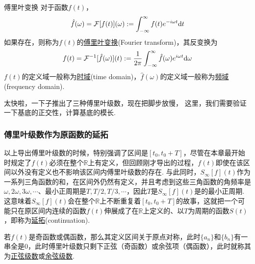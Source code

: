 \begin{definition}{傅里叶变换}
    对于函数\(f(t)\)，
    \[\hat{f}(\omega) = \mathcal{F}[f(t)](\omega) := \int_{-\infty}^{\infty}f(t)e^{-i\omega t}{\rm d}t\]
    如果存在，则称为\(f(t)\)的\uline{傅里叶变换}(Fourier transform)，其反变换为
    \[f(t) = \mathcal{F}^{-1}[\hat{f}(\omega)](t) := \frac{1}{2\pi}\int_{-\infty}^{\infty}\hat{f}(\omega)e^{i\omega t}{\rm d}\omega\]
    \(f(t)\)的定义域一般称为\uline{时域}(time domain)，\(\hat{f}(\omega)\)的定义域一般称为\uline{频域}(frequency domain).
\end{definition}

太快啦，一下子推出了三种傅里叶级数，现在把脚步放慢，
这里，我们需要验证一下基底的正交性，计算基底的模长.


\vspace{1cm}

\subsubsection{傅里叶级数作为原函数的延拓}

以上导出傅里叶级数的时候，特别强调了区间是\([t_0,t_0+T]\)，尽管在本章最开始时规定了\(f(t)\)必须在整个\(\mathbb{R}\)上有定义，但回顾刚才导出的过程，\(f(t)\)即使在该区间以外没有定义也不影响该区间内傅里叶级数的存在. 与此同时，\(S_{\infty}[f](t)\)作为一系列三角函数的和，在区间外仍然有定义，并且考虑到这些三角函数的角频率是\(\omega, 2\omega, 3\omega, \cdots\)、最小正周期是\(T, T/2, T/3, \cdots\)，因此\(T\)是\(S_{\infty}[f](t)\)是的最小正周期. 这意味着\(S_{\infty}[f](t)\)会在整个\(\mathbb{R}\)上不断重复着\([t_0,t_0+T]\)的故事，这就把一个可能只在原区间内连续的函数\(f(t)\)伸展成了在\(\mathbb{R}\)上定义的、以\(T\)为周期的函数\(S(t)\)，即称为\uline{延拓}(continuation).

若\(f(t)\)是奇函数或偶函数，那么其定义区间关于原点对称，此时\(\{a_n\}\)和\(\{b_n\}\)有一串全是\(0\)，此时傅里叶级数只剩下正弦（奇函数）或余弦项（偶函数），此时就称其为\uline{正弦级数}或\uline{余弦级数}. 

